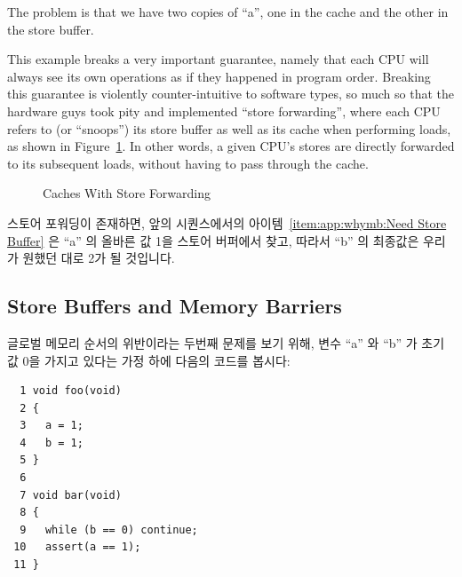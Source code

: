 The problem is that we have two copies of ``a'', one in the cache and
the other in the store buffer.

This example breaks a very important guarantee, namely that each CPU
will always see its own operations as if they happened in program order.
Breaking this guarantee is violently counter-intuitive to software types,
so much so
that the hardware guys took pity and implemented ``store forwarding'',
where each CPU refers to (or ``snoops'') its store buffer as well
as its cache when performing loads, as shown in
Figure~\ref{fig:app:whymb:Caches With Store Forwarding}.
In other words, a given CPU's stores are directly forwarded to its
subsequent loads, without having to pass through the cache.
\fi

\begin{figure}[htb]
\centering
{}
\caption{Caches With Store Forwarding}
\label{fig:app:whymb:Caches With Store Forwarding}
\end{figure}

스토어 포워딩이 존재하면, 앞의 시퀀스에서의 아이템~\ref{item:app:whymb:Need
Store Buffer} 은 ``a'' 의 올바른 값 1을 스토어 버퍼에서 찾고, 따라서 ``b'' 의
최종값은 우리가 원했던 대로 2가 될 것입니다.

\subsection{Store Buffers and Memory Barriers}
\label{sec:app:whymb:Store Buffers and Memory Barriers}

글로벌 메모리 순서의 위반이라는 두번째 문제를 보기 위해, 변수 ``a'' 와 ``b'' 가
초기값 0을 가지고 있다는 가정 하에 다음의 코드를 봅시다:

\vspace{5pt}
\begin{minipage}[t]{\columnwidth}
\small
\begin{verbatim}
  1 void foo(void)
  2 {
  3   a = 1;
  4   b = 1;
  5 }
  6
  7 void bar(void)
  8 {
  9   while (b == 0) continue;
 10   assert(a == 1);
 11 }
\end{verbatim}
\end{minipage}
\vspace{5pt}

